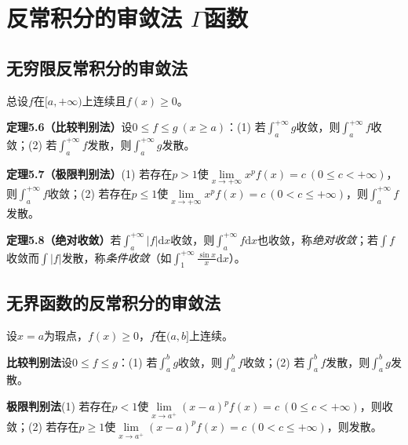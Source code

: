 
\section{反常积分的审敛法 \texorpdfstring{$\Gamma$}{Gamma}函数}

\subsection{无穷限反常积分的审敛法}

总设$f$在$[a,+\infty)$上连续且$f(x)\ge0$。

\noindent\textbf{定理5.6（比较判别法）}\quad 设$0\le f\le g\ (x\ge a)$：(1) 若$\int_a^{+\infty}g$收敛，则$\int_a^{+\infty}f$收敛；(2) 若$\int_a^{+\infty}f$发散，则$\int_a^{+\infty}g$发散。

\noindent\textbf{定理5.7（极限判别法）}\quad (1) 若存在$p>1$使$\lim\limits_{x\to+\infty}x^pf(x)=c\ (0\le c<+\infty)$，则$\int_a^{+\infty}f$收敛；(2) 若存在$p\le1$使$\lim\limits_{x\to+\infty}x^pf(x)=c\ (0<c\le+\infty)$，则$\int_a^{+\infty}f$发散。

\noindent\textbf{定理5.8（绝对收敛）}\quad 若$\int_a^{+\infty}|f|\mathrm{d}x$收敛，则$\int_a^{+\infty}f\mathrm{d}x$也收敛，称\emph{绝对收敛}；若$\int f$收敛而$\int|f|$发散，称\emph{条件收敛}（如$\int_1^{+\infty}\frac{\sin x}{x}\mathrm{d}x$）。

\subsection{无界函数的反常积分的审敛法}

设$x=a$为瑕点，$f(x)\ge0$，$f$在$(a,b]$上连续。

\noindent\textbf{比较判别法}\quad 设$0\le f\le g$：(1) 若$\int_a^bg$收敛，则$\int_a^bf$收敛；(2) 若$\int_a^bf$发散，则$\int_a^bg$发散。

\noindent\textbf{极限判别法}\quad (1) 若存在$p<1$使$\lim\limits_{x\to a^+}(x-a)^pf(x)=c\ (0\le c<+\infty)$，则收敛；(2) 若存在$p\ge1$使$\lim\limits_{x\to a^+}(x-a)^pf(x)=c\ (0<c\le+\infty)$，则发散。



